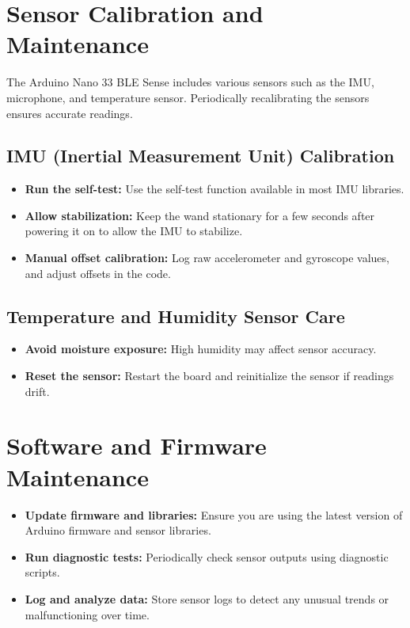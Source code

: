 \section{Sensor Calibration and Maintenance}
The Arduino Nano 33 BLE Sense includes various sensors such as the IMU, microphone, and temperature sensor. Periodically recalibrating the sensors ensures accurate readings.

\subsection{IMU (Inertial Measurement Unit) Calibration}
\begin{itemize}
	\item \textbf{Run the self-test:} Use the self-test function available in most IMU libraries.
	\item \textbf{Allow stabilization:} Keep the wand stationary for a few seconds after powering it on to allow the IMU to stabilize.
	\item \textbf{Manual offset calibration:} Log raw accelerometer and gyroscope values, and adjust offsets in the code.
\end{itemize}

\subsection{Temperature and Humidity Sensor Care}
\begin{itemize}
	\item \textbf{Avoid moisture exposure:} High humidity may affect sensor accuracy.
	\item \textbf{Reset the sensor:} Restart the board and reinitialize the sensor if readings drift.
\end{itemize}

\section{Software and Firmware Maintenance}
\begin{itemize}
	\item \textbf{Update firmware and libraries:} Ensure you are using the latest version of Arduino firmware and sensor libraries.
	\item \textbf{Run diagnostic tests:} Periodically check sensor outputs using diagnostic scripts.
	\item \textbf{Log and analyze data:} Store sensor logs to detect any unusual trends or malfunctioning over time.
\end{itemize}




